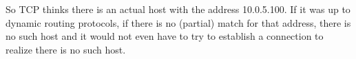 So TCP thinks there is an actual host with the address 10.0.5.100. If it was up to dynamic routing protocols, if there is no (partial) match for that address, there is no such host and it would not even have to try to establish a connection to realize there is no such host.
